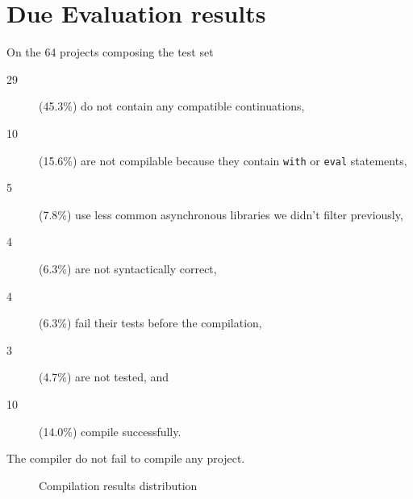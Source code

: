 
\section{Due Evaluation results} \label{section:due-results}

On the 64 projects composing the test set
\begin{description}
\item[29] (45.3\%) do not contain any compatible continuations,
\item[10] (15.6\%) are not compilable because they contain \texttt{with} or \texttt{eval} statements,
\item[5] (7.8\%) use less common asynchronous libraries we didn't filter previously,
\item[4] (6.3\%) are not syntactically correct,
\item[4] (6.3\%) fail their tests before the compilation,
\item[3] (4.7\%) are not tested, and
\item[10] (14.0\%) compile successfully.
\end{description}
The compiler do not fail to compile any project.

\begin{figure}[h!]
\caption{Compilation results distribution}
\end{figure}

